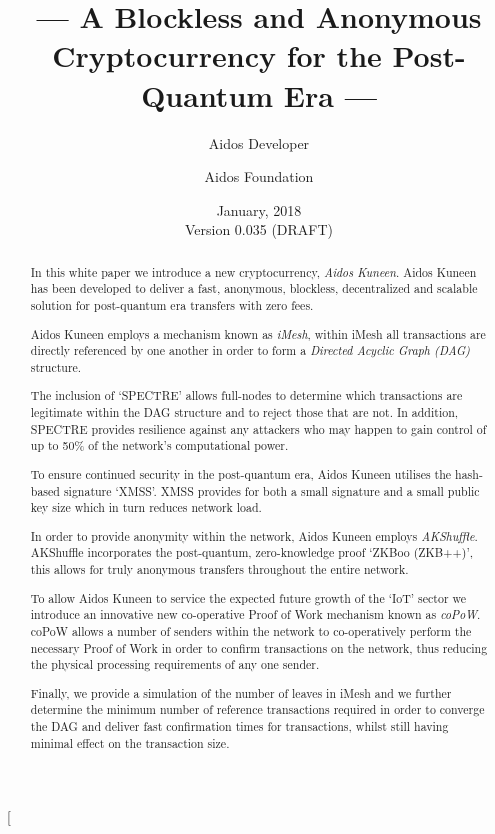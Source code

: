 \documentclass[a4paper,10pt,twocolumn]{article}
\title{--- A Blockless and Anonymous Cryptocurrency for the Post-Quantum Era ---}
\author{
	Aidos Developer \and Aidos Foundation
}
\date{January, 2018 \\ Version 0.035 (DRAFT)}
\begin{document}
\twocolumn[
	\maketitle

\begin{abstract}
		In this white paper we introduce a new cryptocurrency, \emph{Aidos Kuneen}. Aidos Kuneen has been developed to deliver 
		a fast, anonymous, blockless, decentralized and scalable solution for post-quantum era transfers with zero fees. 
		
		Aidos Kuneen employs a mechanism known as \emph{iMesh}, within iMesh all transactions are directly referenced by
		one another in order to form a \emph{Directed Acyclic Graph (DAG)} structure.
		
		The inclusion of `SPECTRE' allows full-nodes to determine which transactions are legitimate within the DAG structure 
		and to reject those that are not. In addition, SPECTRE provides resilience against any attackers who may happen to gain 
		control of up to 50\% of the network's computational power.
		
		To ensure continued security in the post-quantum era, Aidos Kuneen utilises the hash-based signature `XMSS'. XMSS
		provides for both a small signature and a small public key size which in turn reduces network load.
	
		In order to provide anonymity within the network, Aidos Kuneen employs \emph{AKShuffle}. AKShuffle 	
		incorporates the post-quantum, zero-knowledge proof `ZKBoo (ZKB++)', this allows for truly anonymous transfers 
		throughout the entire network.
		
		To allow Aidos Kuneen to service the expected future growth of the `IoT' sector we introduce an innovative new 
		co-operative Proof of Work mechanism known as \emph{coPoW}\@. coPoW allows a number of senders within the network to 
		co-operatively perform the necessary Proof of Work in order to confirm transactions on the network, thus reducing 
		the physical processing requirements of any one sender.
		
		Finally, we provide a simulation of the number of leaves in iMesh and we further determine the minimum number of 
		reference transactions required in order to converge the DAG and deliver fast confirmation times for transactions, 
		whilst still having minimal effect on the transaction size.
		
		\end{abstract}

		\vspace{0.5cm}
\end{document}
